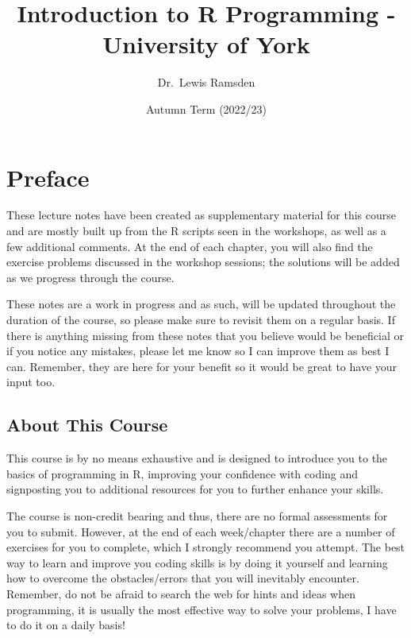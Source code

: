 \documentclass[
]{book}
\title{Introduction to R Programming - University of York}
\author{Dr.~Lewis Ramsden}
\date{Autumn Term (2022/23)}
\theoremstyle{definition}
\theoremstyle{definition}
\theoremstyle{definition}
\theoremstyle{definition}
\theoremstyle{remark}
\begin{document}
\maketitle

{
\setcounter{tocdepth}{1}
\tableofcontents
}
\hypertarget{preface}{%
\chapter*{Preface}\label{preface}}

These lecture notes have been created as supplementary material for this course and are mostly built up from the R scripts seen in the workshops, as well as a few additional comments. At the end of each chapter, you will also find the exercise problems discussed in the workshop sessions; the solutions will be added as we progress through the course.

These notes are a work in progress and as such, will be updated throughout the duration of the course, so please make sure to revisit them on a regular basis. If there is anything missing from these notes that you believe would be beneficial or if you notice any mistakes, please let me know so I can improve them as best I can. Remember, they are here for your benefit so it would be great to have your input too.

\hypertarget{about-this-course}{%
\section*{About This Course}\label{about-this-course}}

This course is by no means exhaustive and is designed to introduce you to the basics of programming in R, improving your confidence with coding and signposting you to additional resources for you to further enhance your skills.

The course is non-credit bearing and thus, there are no formal assessments for you to submit. However, at the end of each week/chapter there are a number of exercises for you to complete, which I strongly recommend you attempt. The best way to learn and improve you coding skills is by doing it yourself and learning how to overcome the obstacles/errors that you will inevitably encounter. Remember, do not be afraid to search the web for hints and ideas when programming, it is usually the most effective way to solve your problems, I have to do it on a daily basis!
\end{document}

